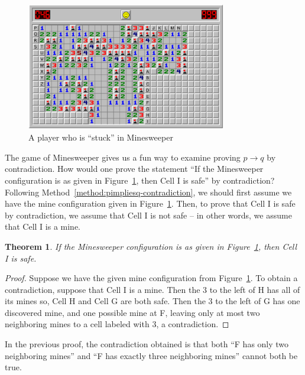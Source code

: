 \documentclass{book}
\newcounter{ekcounter}%
\theoremstyle{ekimcustom}
\newtheorem{theorem}[ekcounter]{Theorem}
\begin{document}
\begin{figure}[hbt]
\begin{center}
\includegraphics[width=0.78\textwidth]{minesweeper-labeled}
\end{center}
\caption{A player who is ``stuck'' in Minesweeper}\label{figure:minesweeper1}
\end{figure}

The game of Minesweeper gives us a fun way to examine proving $p \rightarrow q$ by contradiction. How would one prove the statement ``If the Minesweeper configuration is as given in Figure~\ref{figure:minesweeper1}, then Cell I is safe'' by contradiction? Following Method~\ref{method:pimpliesq-contradiction}, we should first assume we have the mine configuration given in Figure~\ref{figure:minesweeper1}. Then, to prove that Cell I is safe by contradiction, we assume that Cell I is not safe -- in other words, we assume that Cell I is a mine.
\begin{theorem}
If the Minesweeper configuration is as given in Figure~\ref{figure:minesweeper1}, then Cell I is safe.
\end{theorem}
\begin{proof}
Suppose we have the given mine configuration from Figure~\ref{figure:minesweeper1}. To obtain a contradiction, suppose that Cell I is a mine. Then the 3 to the left of H has all of its mines so, Cell H and Cell G are both safe. Then the 3 to the left of G has one discovered mine, and one possible mine at F, leaving only at most two neighboring mines to a cell labeled with 3, a contradiction.
\end{proof}
In the previous proof, the contradiction obtained is that both ``F has only two neighboring mines'' and ``F has exactly three neighboring mines'' cannot both be true.

\end{document}
